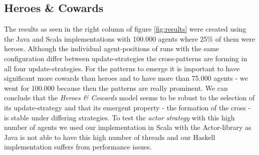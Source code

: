 \subsection{Heroes \& Cowards}
The results as seen in the right column of figure \ref{fig:results} were created using the Java and Scala implementations with 100.000 agents where 25\% of them were heroes. Although the individual agent-positions of runs with the same configuration differ between update-strategies the cross-patterns are forming in all four update-strategies. For the patterns to emerge it is important to have significant more cowards than heroes and to have more than 75.000 agents - we went for 100.000 because then the patterns are really prominent. We can conclude that the \textit{Heroes \& Cowards} model seems to be robust to the selection of its update-strategy and that its emergent property - the formation of the cross - is stable under differing strategies. To test the \textit{actor strategy} with this high number of agents we used our implementation in Scala with the Actor-library as Java is not able to have this high number of threads and our Haskell implementation suffers from performance issues.